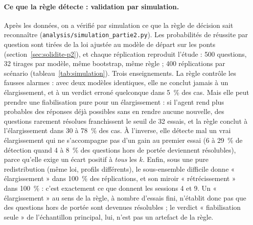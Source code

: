 \documentclass[11pt,a4paper]{article}
\begin{document}
\paragraph{Ce que la règle détecte : validation par simulation.} Après les données, on a vérifié par simulation ce que la règle de décision sait reconnaître (\texttt{analysis/simulation\_partie2.py}). Les probabilités de réussite par question sont tirées de la loi ajustée au modèle de départ sur les ponts (section~\ref{sec:solidite-p2}), et chaque réplication reproduit l'étude : 500 questions, 32 tirages par modèle, même bootstrap, même règle ; 400 réplications par scénario (tableau~\ref{tab:simulation}). Trois enseignements. La règle contrôle les fausses alarmes : avec deux modèles identiques, elle ne conclut jamais à un élargissement, et à un verdict erroné quelconque dans 5~\% des cas. Mais elle peut prendre une fiabilisation pure pour un élargissement : si l'agent rend plus probables des réponses déjà possibles sans en rendre aucune nouvelle, des questions rarement résolues franchissent le seuil de 32 essais, et la règle conclut à l'élargissement dans 30 à 78~\% des cas. À l'inverse, elle détecte mal un vrai élargissement qui ne s'accompagne pas d'un gain au premier essai (6 à 29~\% de détection quand 4 à 8~\% des questions hors de portée deviennent résolubles), parce qu'elle exige un écart positif à \emph{tous} les $k$. Enfin, sous une pure redistribution (même loi, profils différents), le sous-ensemble difficile donne « élargissement » dans 100~\% des réplications, et son miroir « rétrécissement » dans 100~\% : c'est exactement ce que donnent les sessions 4 et 9. Un « élargissement » au sens de la règle, à nombre d'essais fini, n'établit donc pas que des questions hors de portée sont devenues résolubles ; le verdict « fiabilisation seule » de l'échantillon principal, lui, n'est pas un artefact de la règle.
\end{document}
